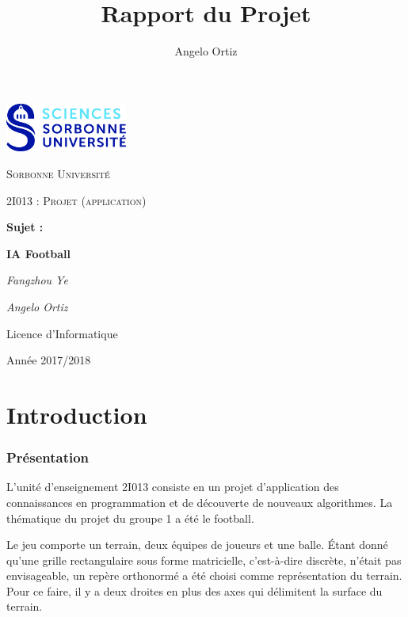 \documentclass[12pt,a4paper]{article}
\author{Angelo Ortiz}
\title{Rapport du Projet}
\begin{document}
\begin{titlepage}
  \centering
  \includegraphics[width=0.30\textwidth]{../img/logo.jpg}\par\vspace{1cm}
  {\scshape\LARGE Sorbonne Universit\'e\par}
  \vspace{1cm}
  {\scshape\Large 2I013 : Projet (application)\par}
  \vspace{1.5cm}
  {\Large \bfseries Sujet :\par}
  {\huge\bfseries IA Football\par}
  \vspace{2cm}
  {\Large\itshape Fangzhou Ye\par}
  {\Large\itshape Angelo Ortiz\par}
  \vfill
  
  {\large Licence d'Informatique\par}
  {\large Ann\'ee 2017/2018\par}
\end{titlepage}
 
\tableofcontents
\listoffigures
\newpage
  
\part*{Introduction}
\section*{Pr\'esentation}
L'unit\'e d'enseignement 2I013 consiste en un projet d'application des 
connaissances en programmation et de d\'ecouverte de nouveaux algorithmes. La 
th\'ematique du 
projet du groupe 1 a \'et\'e le football.

Le jeu comporte un terrain, deux \'equipes de joueurs et une 
balle. \'Etant donn\'e qu'une grille rectangulaire sous forme matricielle, 
c'est-\`a-dire discr\`ete, n'\'etait pas envisageable, un rep\`ere 
orthonorm\'e a \'et\'e choisi comme repr\'esentation du terrain. Pour ce faire, 
il y a deux droites en plus des axes qui d\'elimitent la surface du terrain.
\end{document}
